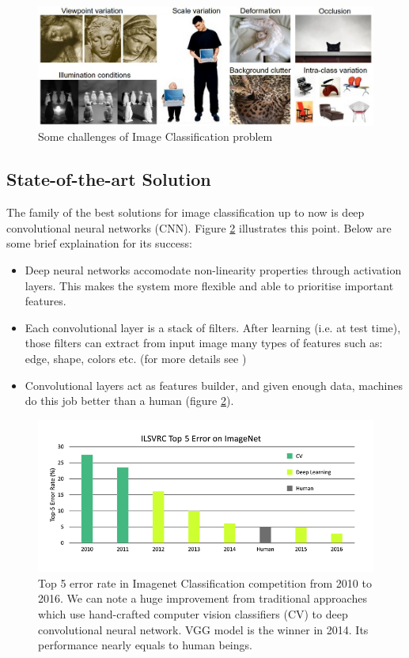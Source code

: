 \begin{figure}[tb]
\centering
\includegraphics[width =0.9\hsize]{./figures/ImClasschallenges}
\caption{Some challenges of Image Classification problem}
\label{fig:ImClasschallenges}
\end{figure}
\subsection{State-of-the-art Solution}
The family of the best solutions for image classification up to now is deep convolutional neural networks (CNN). Figure \ref{fig:imagenetTop5Err} illustrates this point. Below are some brief explaination for its success:
\begin{itemize}
	\item Deep neural networks accomodate non-linearity properties through activation layers. This makes the system more flexible and able to prioritise important features.
	\item Each convolutional layer is a stack of filters. After learning (i.e. at test time), those filters can extract from input image many types of features such as: edge, shape, colors etc. (for more details see \cite{DeepVis:2015})
	\item Convolutional layers act as features builder, and given enough data, machines do this job better than a human (figure \ref{fig:imagenetTop5Err}).
\end{itemize}


\begin{figure}[tb]
\centering
\includegraphics[width=0.9\hsize]{./figures/imagenetTop5Err}
\caption{Top 5 error rate in Imagenet Classification competition from 2010 to 2016. We can note a huge improvement from traditional approaches which use hand-crafted computer vision classifiers (CV) to deep convolutional neural network. VGG model \cite{DBLP:journals/corr/SimonyanZ14a} is the winner in 2014. Its performance nearly equals to human beings.}
\label{fig:imagenetTop5Err}
\end{figure}

